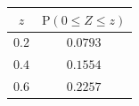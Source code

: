 {\setlength{\tabcolsep}{5pt}\renewcommand{\arraystretch}{1.25}%
\begin{tabular}{|c|c|}
\hline
$z$ & $\mathrm{P}(0\le Z\le z)$ \\
\hline
$0.2$ & $0.0793$ \\
\hline
$0.4$ & $0.1554$ \\
\hline
$0.6$ & $0.2257$ \\
\hline
\end{tabular}}
